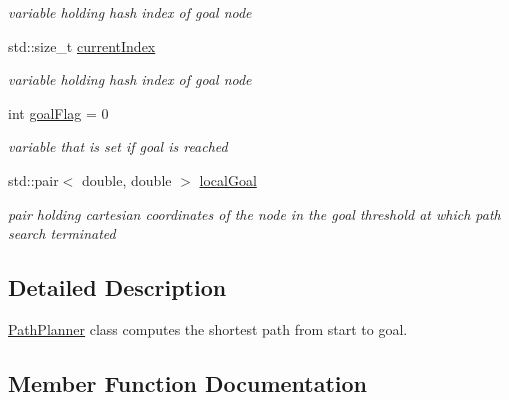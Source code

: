 \begin{DoxyCompactItemize}
\begin{DoxyCompactList}\small\item\em variable holding hash index of goal node \end{DoxyCompactList}\item 
std\+::size\+\_\+t \hyperlink{classPathPlanner_a20e0d0b12dd6f28021b583ed688fdabf}{current\+Index}\hypertarget{classPathPlanner_a20e0d0b12dd6f28021b583ed688fdabf}{}\label{classPathPlanner_a20e0d0b12dd6f28021b583ed688fdabf}

\begin{DoxyCompactList}\small\item\em variable holding hash index of goal node \end{DoxyCompactList}\item 
int \hyperlink{classPathPlanner_a65d2728bf7bf5033024e3a35ddd9e7d4}{goal\+Flag} = 0\hypertarget{classPathPlanner_a65d2728bf7bf5033024e3a35ddd9e7d4}{}\label{classPathPlanner_a65d2728bf7bf5033024e3a35ddd9e7d4}

\begin{DoxyCompactList}\small\item\em variable that is set if goal is reached \end{DoxyCompactList}\item 
std\+::pair$<$ double, double $>$ \hyperlink{classPathPlanner_ad2c946eeef27293e5ba8cb91f0a86553}{local\+Goal}\hypertarget{classPathPlanner_ad2c946eeef27293e5ba8cb91f0a86553}{}\label{classPathPlanner_ad2c946eeef27293e5ba8cb91f0a86553}

\begin{DoxyCompactList}\small\item\em pair holding cartesian coordinates of the node in the goal threshold at which path search terminated \end{DoxyCompactList}\end{DoxyCompactItemize}


\subsection{Detailed Description}
\hyperlink{classPathPlanner}{Path\+Planner} class computes the shortest path from start to goal. 

\subsection{Member Function Documentation}
